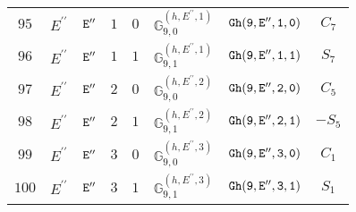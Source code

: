 \documentclass[fleqn,8pt]{jsarticle}
\begin{document}
\begin{table}[ht!]
\begin{center}
\begin{tabular}{cccccccc}
$ 95 $ & $ E^{\prime\prime} $ & $ {\tt E''} $ & $ 1 $ & $ 0 $ & $ \mathbb{G}_{9,0}^{(h,E^{\prime\prime},1)} $ & $ {\tt Gh(9,E'',1,0)} $ & $ C_{7} $ \\
$ 96 $ & $ E^{\prime\prime} $ & $ {\tt E''} $ & $ 1 $ & $ 1 $ & $ \mathbb{G}_{9,1}^{(h,E^{\prime\prime},1)} $ & $ {\tt Gh(9,E'',1,1)} $ & $ S_{7} $ \\
$ 97 $ & $ E^{\prime\prime} $ & $ {\tt E''} $ & $ 2 $ & $ 0 $ & $ \mathbb{G}_{9,0}^{(h,E^{\prime\prime},2)} $ & $ {\tt Gh(9,E'',2,0)} $ & $ C_{5} $ \\
$ 98 $ & $ E^{\prime\prime} $ & $ {\tt E''} $ & $ 2 $ & $ 1 $ & $ \mathbb{G}_{9,1}^{(h,E^{\prime\prime},2)} $ & $ {\tt Gh(9,E'',2,1)} $ & $ - S_{5} $ \\
$ 99 $ & $ E^{\prime\prime} $ & $ {\tt E''} $ & $ 3 $ & $ 0 $ & $ \mathbb{G}_{9,0}^{(h,E^{\prime\prime},3)} $ & $ {\tt Gh(9,E'',3,0)} $ & $ C_{1} $ \\
$ 100 $ & $ E^{\prime\prime} $ & $ {\tt E''} $ & $ 3 $ & $ 1 $ & $ \mathbb{G}_{9,1}^{(h,E^{\prime\prime},3)} $ & $ {\tt Gh(9,E'',3,1)} $ & $ S_{1} $ \\
 \hline \hline
\end{tabular}
\end{center}
\end{table}
\end{document}
